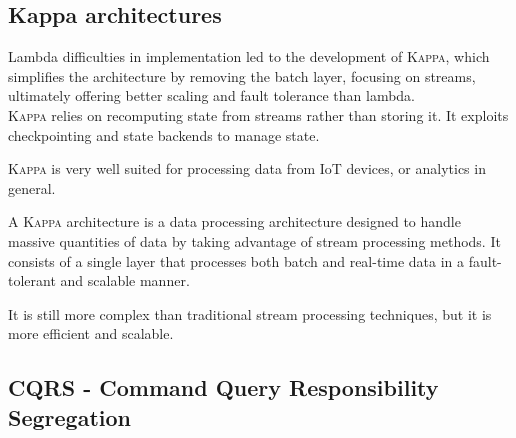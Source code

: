 \subsection{Kappa architectures}
Lambda difficulties in implementation led to the development of \textsc{Kappa}, which simplifies the architecture by removing the batch layer, focusing on streams, ultimately offering better scaling and fault tolerance than lambda.\\
\textsc{Kappa} relies on recomputing state from streams rather than storing it.
It exploits checkpointing and state backends to manage state.

\textsc{Kappa} is very well suited for processing data from IoT devices, or analytics in general.

A \textsc{Kappa} architecture is a data processing architecture designed to handle massive quantities of data by taking advantage of stream processing methods. It consists of a single layer that processes both batch and real-time data in a fault-tolerant and scalable manner.

It is still more complex than traditional stream processing techniques, but it is more efficient and scalable.


\newpage
\subsection{CQRS - Command Query Responsibility Segregation}


